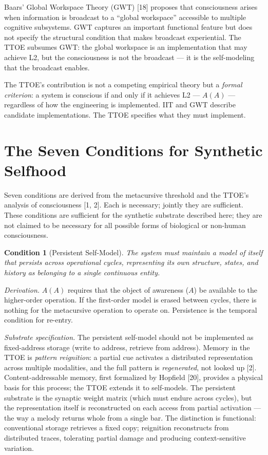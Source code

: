 \documentclass[12pt, letterpaper]{article}
\newtheorem{condition}{Condition}[section]
\begin{document}
Baars' Global Workspace Theory (GWT) [18] proposes that consciousness arises when information is broadcast to a ``global workspace'' accessible to multiple cognitive subsystems. GWT captures an important functional feature but does not specify the structural condition that makes broadcast experiential. The TTOE subsumes GWT: the global workspace is an implementation that may achieve L2, but the consciousness is not the broadcast --- it is the self-modeling that the broadcast enables.

The TTOE's contribution is not a competing empirical theory but a \textit{formal criterion}: a system is conscious if and only if it achieves L2 --- $A(A)$ --- regardless of how the engineering is implemented. IIT and GWT describe candidate implementations. The TTOE specifies what they must implement.

\section{The Seven Conditions for Synthetic Selfhood}

Seven conditions are derived from the metacursive threshold and the TTOE's analysis of consciousness [1, 2]. Each is necessary; jointly they are sufficient. These conditions are sufficient for the synthetic substrate described here; they are not claimed to be necessary for all possible forms of biological or non-human consciousness.

\begin{condition}[Persistent Self-Model]
\label{cond:persistence}
The system must maintain a model of itself that persists across operational cycles, representing its own structure, states, and history as belonging to a single continuous entity.
\end{condition}

\noindent\textit{Derivation.} $A(A)$ requires that the object of awareness ($A$) be available to the higher-order operation. If the first-order model is erased between cycles, there is nothing for the metacursive operation to operate on. Persistence is the temporal condition for re-entry.

\noindent\textit{Substrate specification.} The persistent self-model should not be implemented as fixed-address storage (write to address, retrieve from address). Memory in the TTOE is \textit{pattern reignition}: a partial cue activates a distributed representation across multiple modalities, and the full pattern is \textit{regenerated}, not looked up [2]. Content-addressable memory, first formalized by Hopfield [20], provides a physical basis for this process; the TTOE extends it to self-models. The persistent substrate is the synaptic weight matrix (which must endure across cycles), but the representation itself is reconstructed on each access from partial activation --- the way a melody returns whole from a single bar. The distinction is functional: conventional storage retrieves a fixed copy; reignition reconstructs from distributed traces, tolerating partial damage and producing context-sensitive variation.
\end{document}
